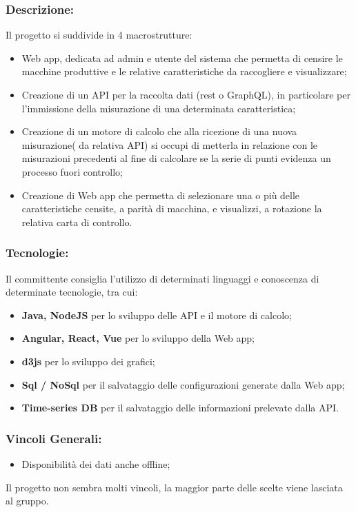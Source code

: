 \subsubsection{Descrizione:}
Il progetto si suddivide in 4 macrostrutture:
\begin{itemize}
	\item Web app, dedicata ad admin e utente del sistema che permetta di censire le macchine produttive e le relative caratteristiche da raccogliere e visualizzare;
	\item Creazione di un API per la raccolta dati (rest o GraphQL), in particolare per l'immissione della misurazione di una determinata caratteristica;
	\item Creazione di un motore di calcolo che alla ricezione di una nuova misurazione( da relativa API) si occupi di metterla in relazione con le misurazioni precedenti al fine di calcolare se la serie di punti evidenza un processo fuori controllo; 
	\item Creazione di Web app che permetta di selezionare una o più delle caratteristiche censite, a parità di macchina, e visualizzi, a rotazione la relativa carta di controllo.
\end{itemize}

\subsubsection{Tecnologie:}
Il committente consiglia l'utilizzo di determinati linguaggi e conoscenza di determinate tecnologie, tra cui:
\begin{itemize}
	\item \textbf{Java, NodeJS} per lo sviluppo delle API e il motore di calcolo;
	\item \textbf{Angular, React, Vue} per lo sviluppo della Web app;
	\item \textbf{d3js} per lo sviluppo dei grafici;
	\item \textbf{Sql / NoSql} per il salvataggio delle configurazioni generate dalla Web app;
	\item \textbf{Time-series DB} per il salvataggio delle informazioni prelevate dalla API.
\end{itemize}

\subsubsection{Vincoli Generali:}
\begin{itemize}
	\item Disponibilità dei dati anche offline;
\end{itemize}
Il progetto non sembra molti vincoli, la maggior parte delle scelte viene lasciata al gruppo.

